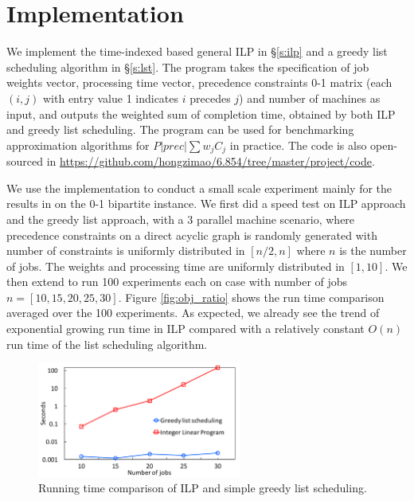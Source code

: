 \section{Implementation} \label{s:impl}
We implement the time-indexed based general ILP in \S\ref{s:ilp} and a greedy list scheduling algorithm in \S\ref{s:lst}. The program takes the specification of job weights vector, processing time vector, precedence constraints 0-1 matrix (each $(i, j)$ with entry value 1 indicates $i$ precedes $j$) and number of machines as input, and outputs the weighted sum of completion time, obtained by both ILP and greedy list scheduling. The program can be used for benchmarking approximation algorithms for $P|prec|\sum w_j C_j$ in practice. The code is also open-sourced in \url{https://github.com/hongzimao/6.854/tree/master/project/code}.

We use the implementation to conduct a small scale experiment mainly for the results in \cite{schulz2011near} on the 0-1 bipartite instance. We first did a speed test on ILP approach and the greedy list approach, with a 3 parallel machine scenario, where precedence constraints on a direct acyclic graph is randomly generated with number of constraints is uniformly distributed in $[n/2, n]$ where $n$ is the number of jobs. The weights and processing time are uniformly distributed in $[1, 10]$. We then extend to run 100 experiments each on case with number of jobs $n = [10, 15, 20, 25, 30]$. Figure \ref{fig:obj_ratio} shows the run time comparison averaged over the 100 experiments. As expected, we already see the trend of exponential growing run time in ILP compared with a relatively constant $O(n)$ run time of the list scheduling algorithm.

\begin{figure}[h]
	\centering
	\includegraphics[width=0.6\textwidth]{figs/runtime.pdf}
	\caption{Running time comparison of ILP and simple greedy list scheduling.}
	\label{fig:runtime}
\end{figure}


